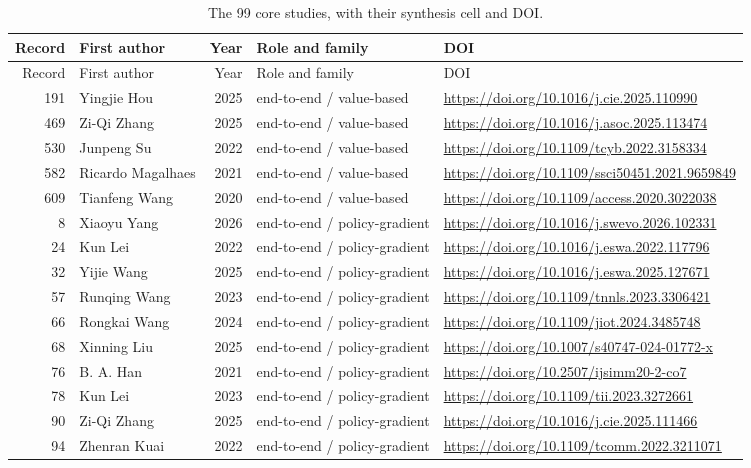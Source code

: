 \begin{longtable}{r p{3.0cm} r p{4.2cm} p{4.6cm}}
\caption{The 99 core studies, with their synthesis cell and DOI.}
\label{tab:core-studies}\\
\toprule
Record & First author & Year & Role and family & DOI \\
\midrule
\endfirsthead
\toprule
Record & First author & Year & Role and family & DOI \\
\midrule
\endhead
191 & Yingjie Hou & 2025 & end-to-end / value-based & \url{https://doi.org/10.1016/j.cie.2025.110990} \\
469 & Zi-Qi Zhang & 2025 & end-to-end / value-based & \url{https://doi.org/10.1016/j.asoc.2025.113474} \\
530 & Junpeng Su & 2022 & end-to-end / value-based & \url{https://doi.org/10.1109/tcyb.2022.3158334} \\
582 & Ricardo Magalhaes & 2021 & end-to-end / value-based & \url{https://doi.org/10.1109/ssci50451.2021.9659849} \\
609 & Tianfeng Wang & 2020 & end-to-end / value-based & \url{https://doi.org/10.1109/access.2020.3022038} \\
8 & Xiaoyu Yang & 2026 & end-to-end / policy-gradient & \url{https://doi.org/10.1016/j.swevo.2026.102331} \\
24 & Kun Lei & 2022 & end-to-end / policy-gradient & \url{https://doi.org/10.1016/j.eswa.2022.117796} \\
32 & Yijie Wang & 2025 & end-to-end / policy-gradient & \url{https://doi.org/10.1016/j.eswa.2025.127671} \\
57 & Runqing Wang & 2023 & end-to-end / policy-gradient & \url{https://doi.org/10.1109/tnnls.2023.3306421} \\
66 & Rongkai Wang & 2024 & end-to-end / policy-gradient & \url{https://doi.org/10.1109/jiot.2024.3485748} \\
68 & Xinning Liu & 2025 & end-to-end / policy-gradient & \url{https://doi.org/10.1007/s40747-024-01772-x} \\
76 & B. A. Han & 2021 & end-to-end / policy-gradient & \url{https://doi.org/10.2507/ijsimm20-2-co7} \\
78 & Kun Lei & 2023 & end-to-end / policy-gradient & \url{https://doi.org/10.1109/tii.2023.3272661} \\
90 & Zi-Qi Zhang & 2025 & end-to-end / policy-gradient & \url{https://doi.org/10.1016/j.cie.2025.111466} \\
94 & Zhenran Kuai & 2022 & end-to-end / policy-gradient & \url{https://doi.org/10.1109/tcomm.2022.3211071} \\

\end{longtable}
